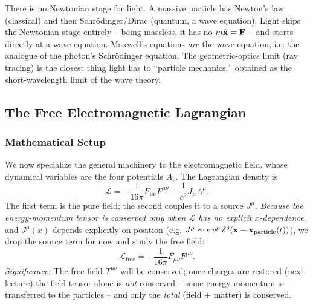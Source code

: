 \begin{remark}
There is no Newtonian stage for light. A massive particle has Newton's law (classical) and
then Schr\"odinger/Dirac (quantum, a wave equation). Light skips the Newtonian stage
entirely -- being massless, it has no $m\ddot{\mathbf{x}}=\mathbf{F}$ -- and starts directly at a
wave equation. Maxwell's equations \emph{are} the wave equation, i.e. the analogue of the
photon's Schr\"odinger equation. The geometric-optics limit (ray tracing) is the closest
thing light has to ``particle mechanics,'' obtained as the short-wavelength limit of the
wave theory.
\end{remark}

\subsection{The Free Electromagnetic Lagrangian}
\label{subsec:lec23:em-lagrangian}

\subsubsection*{Mathematical Setup}
We now specialize the general machinery to the electromagnetic field, whose dynamical
variables are the four potentials $A_\nu$. The Lagrangian density is
\begin{equation}\label{eq:lec23:em-L}
  \boxed{\;\mathcal L=-\frac{1}{16\pi}F_{\mu\nu}F^{\mu\nu}
          -\frac{1}{c^2}J_\mu A^\mu .\;}
\end{equation}
The first term is the pure field; the second couples it to a source $J^\mu$. \emph{Because
the energy-momentum tensor is conserved only when $\mathcal L$ has no explicit
$x$-dependence}, and $J^\mu(x)$ depends explicitly on position (e.g.
$J^\mu\sim e\,v^\mu\,\delta^3(\mathbf{x}-\mathbf{x}_{\text{particle}}(t))$), we drop the source
term for now and study the free field:
\begin{equation}\label{eq:lec23:em-L-free}
  \mathcal L_{\text{free}}=-\frac{1}{16\pi}F_{\mu\nu}F^{\mu\nu}.
\end{equation}
\textit{Significance:} The free-field $T^{\mu\nu}$ will be conserved; once charges are
restored (next lecture) the field tensor alone is \emph{not} conserved -- some
energy-momentum is transferred to the particles -- and only the \emph{total}
(field $+$ matter) is conserved.

